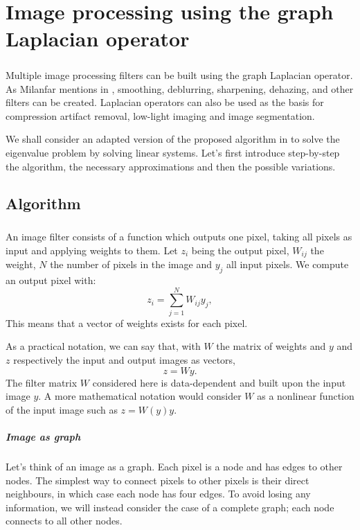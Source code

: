 \chapter{Image processing using the graph Laplacian operator}

\paragraph{}
Multiple image processing filters can be built using the graph Laplacian operator.
As Milanfar mentions in \cite{siam_slides_2016} \cite{glide_2014} \cite{talebi_nonlocal_2014}, smoothing, deblurring, sharpening, dehazing, and other filters can be created.
Laplacian operators can also be used as the basis for compression artifact removal, low-light imaging and image segmentation.

We shall consider an adapted version of the proposed algorithm in \cite{glide_2014} to solve the eigenvalue problem by solving linear systems.
Let's first introduce step-by-step the algorithm, the necessary approximations and then the possible variations.

\section{Algorithm}

\paragraph{}
An image filter consists of a function which outputs one pixel, taking all pixels as input and applying weights to them.
Let \(z_i\) being the output pixel, \(W_{ij}\) the weight, \(N\) the number of pixels in the image and \(y_j\) all input pixels.
We compute an output pixel with:
\[z_i = \sum^{N}_{j=1} W_{ij}y_j,\]
This means that a vector of weights exists for each pixel.

As a practical notation, we can say that, with \(W\) the matrix of weights and \(y\) and \(z\) respectively the input and output images as vectors,
\[z = Wy.\]
The filter matrix \(W\) considered here is data-dependent and built upon the input image \(y\).
A more mathematical notation would consider \(W\) as a nonlinear function of the input image such as \(z = W(y) y\).

\paragraph{Image as graph}
Let's think of an image as a graph.
Each pixel is a node and has edges to other nodes.
The simplest way to connect pixels to other pixels is their direct neighbours, in which case each node has four edges.
To avoid losing any information, we will instead consider the case of a complete graph; each node connects to all other nodes.

